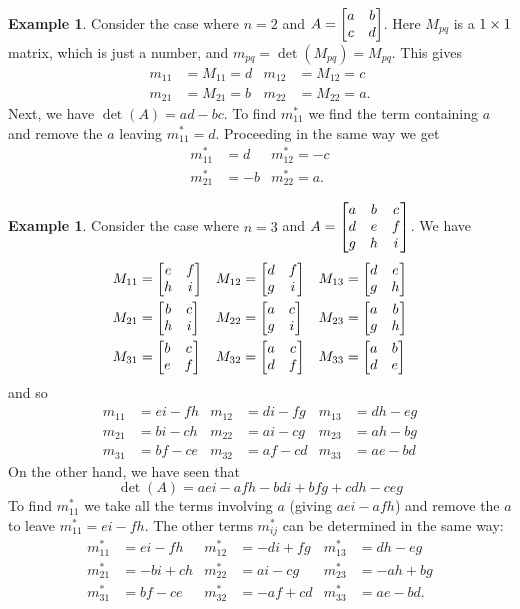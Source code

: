\documentclass[reqno]{amsart}
\theoremstyle{definition}
\newtheorem{example}[theorem]{Example}
\begin{document}
\begin{example}\label{eg-minors-two}
 Consider the case where $n=2$ and $A=\left[\begin{matrix} a&b\\ c&d\end{matrix}\right]$.  Here
 $M_{pq}$ is a $1\times 1$ matrix, which is just a number, and
 $m_{pq}=\det(M_{pq})=M_{pq}$.  This gives
 \begin{align*}
  m_{11} &= M_{11} = d & m_{12} &= M_{12} = c \\
  m_{21} &= M_{21} = b & m_{22} &= M_{22} = a.
 \end{align*}
 Next, we have $\det(A)=ad-bc$.  To find $m^*_{11}$ we find the term
 containing $a$ and remove the $a$ leaving $m^*_{11}=d$.  Proceeding
 in the same way we get
 \begin{align*}
  m^*_{11} &=  d & m^*_{12} = -c \\
  m^*_{21} &= -b & m^*_{22} = a.
 \end{align*}
\end{example}

\begin{example}\label{eg-minors-three}
 Consider the case where $n=3$ and
 $A=\left[\begin{matrix} a&b&c\\
         d&e&f\\
         g&h&i
    \end{matrix}\right]$.
 We have
 \begin{align*}
  M_{11} &= \left[\begin{matrix} e&f\\ h&i\end{matrix}\right] &
  M_{12} &= \left[\begin{matrix} d&f\\ g&i\end{matrix}\right] &
  M_{13} &= \left[\begin{matrix} d&e\\ g&h\end{matrix}\right] \\
  M_{21} &= \left[\begin{matrix} b&c\\ h&i\end{matrix}\right] &
  M_{22} &= \left[\begin{matrix} a&c\\ g&i\end{matrix}\right] &
  M_{23} &= \left[\begin{matrix} a&b\\ g&h\end{matrix}\right] \\
  M_{31} &= \left[\begin{matrix} b&c\\ e&f\end{matrix}\right] &
  M_{32} &= \left[\begin{matrix} a&c\\ d&f\end{matrix}\right] &
  M_{33} &= \left[\begin{matrix} a&b\\ d&e\end{matrix}\right]
 \end{align*}
 and so
 \begin{align*}
  m_{11} &= ei-fh &
  m_{12} &= di-fg &
  m_{13} &= dh-eg \\
  m_{21} &= bi-ch &
  m_{22} &= ai-cg &
  m_{23} &= ah-bg \\
  m_{31} &= bf-ce &
  m_{32} &= af-cd &
  m_{33} &= ae-bd
 \end{align*}
 On the other hand, we have seen that
 \[ \det(A) = aei-afh-bdi+bfg+cdh-ceg \]
 To find $m^*_{11}$ we take all the terms involving $a$ (giving
 $aei-afh$) and remove the $a$ to leave $m^*_{11}=ei-fh$.  The other
 terms $m^*_{ij}$ can be determined in the same way:
 \begin{align*}
  m^*_{11} &=  ei-fh & m^*_{12} &= -di+fg & m^*_{13} &=  dh-eg \\
  m^*_{21} &= -bi+ch & m^*_{22} &=  ai-cg & m^*_{23} &= -ah+bg \\
  m^*_{31} &=  bf-ce & m^*_{32} &= -af+cd & m^*_{33} &=  ae-bd.
 \end{align*}
\end{example}
\end{document}
